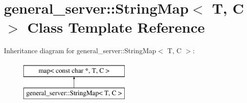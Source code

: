 \hypertarget{classgeneral__server_1_1StringMap}{\section{general\-\_\-server\-:\-:\-String\-Map$<$ \-T, \-C $>$ \-Class \-Template \-Reference}
\label{classgeneral__server_1_1StringMap}
}
\-Inheritance diagram for general\-\_\-server\-:\-:\-String\-Map$<$ \-T, \-C $>$\-:\begin{figure}[H]
\begin{center}
\leavevmode
\includegraphics[height=2.000000cm]{classgeneral__server_1_1StringMap}
\end{center}
\end{figure}
